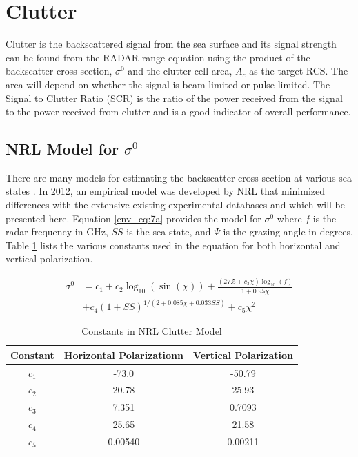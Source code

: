 \section{Clutter}
Clutter is the backscattered signal from the sea surface and its signal strength can be found from the RADAR range equation using the product of the backscatter cross section, $\sigma^0$ and the clutter cell area, $A_c$ as the target RCS. The area will depend on whether the signal is beam limited or pulse limited. The Signal to Clutter Ratio (SCR) is the ratio of the power received from the signal to the power received from clutter and is a good indicator of overall performance.

\subsection{NRL Model for $\sigma^0$}
There are many models for estimating the backscatter cross section at various sea states \cite{blake_radar} \cite{richards_radar} \cite{nathanson_radar}. In 2012, an empirical model was developed by NRL that minimized differences with the extensive existing experimental databases \cite{gregers-hansen_clutter} and which will be presented here. Equation \ref{env_eq:7a} provides the model for $\sigma^0$ where $f$ is the radar frequency in GHz, $SS$ is the sea state, and $\Psi$ is the grazing angle in degrees. Table \ref{env_tab:0} lists the various constants used in the equation for both horizontal and vertical polarization.

\begin{equation}
\begin{aligned}
  \sigma^0 &= c_1 + c_2 \log_{10}(\sin(\chi))+\frac{\left(27.5 + c_3\chi\right)\log_{10}(f)}{1+0.95\chi}\\
  &+c_4\left(1 + SS \right)^{1/\left(2+0.085\chi + 0.033SS\right)}
 + c_5\chi^2 
 \end{aligned}
 \label{env_eq:7a}
  \end{equation}
  
  \begin{table}[H]
  \begin{center}
      \renewcommand{\baselinestretch}{1} \small\normalsize
  \begin{quote}
    \caption[Constants in NRL Clutter Model]{Constants in NRL Clutter Model\label{env_tab:0}}
  \end{quote}
  \begin{tabular} {|c | c | c|}
    \hline
  \bf{Constant} & \bf{Horizontal Polarization}n & \bf{Vertical Polarization} \\ \hline
  $c_1$ & -73.0 & -50.79  \\ \hline
  $c_2$ & 20.78 & 25.93  \\ \hline
  $c_3$ & 7.351 & 0.7093 \\ \hline
  $c_4$ & 25.65 & 21.58  \\ \hline
  $c_5$ & 0.00540 & 0.00211 \\ \hline
\end{tabular}
\end{center}
\end{table}
\renewcommand{\baselinestretch}{2} \small\normalsize
  

